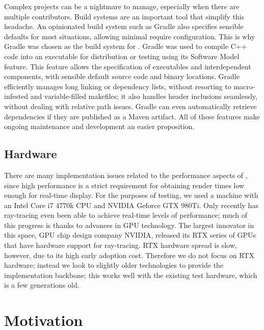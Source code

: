 
Complex projects can be a nightmare to manage, especially when there are multiple contributors.
Build systems are an important tool that simplify this headache.
An opinionated build system such as Gradle also specifies sensible defaults for most situations, allowing minimal require configuration.
This is why Gradle was chosen as the build system for \name.
Gradle was used to compile C++ code into an executable for distribution or testing using its Software Model feature.
This feature allows the specification of executables and interdependent components, with sensible default source code and binary locations.
Gradle efficiently manages long linking or dependency lists, without resorting to macro-infested and variable-filled makefiles; it also handles header inclusions seamlessly, without dealing with relative path issues.
Gradle can even automatically retrieve dependencies if they are published as a Maven artifact.
All of these features make ongoing maintenance and development an easier proposition.

\subsection{Hardware}
\label{ch:intro:background:hardware}

There are many implementation issues related to the performance aspects of \name, since high performance is a strict requirement for obtaining render times low enough for real-time display.
For the purposes of testing, we used a machine with an Intel Core i7 4770k CPU and NVIDIA Geforce GTX 980Ti.
Only recently has ray-tracing even been able to achieve real-time levels of performance; much of this progress is thanks to advances in GPU technology.
The largest innovator in this space, GPU chip design company NVIDIA, released its RTX series of GPUs that have hardware support for ray-tracing.
RTX hardware spread is slow, however, due to its high early adoption cost.
Therefore we do not focus on RTX hardware; instead we look to slightly older technologies to provide the implementation backbone; this works well with the existing test hardware, which is a few generations old.



\section{Motivation} \label{ch:intro:motivation}

